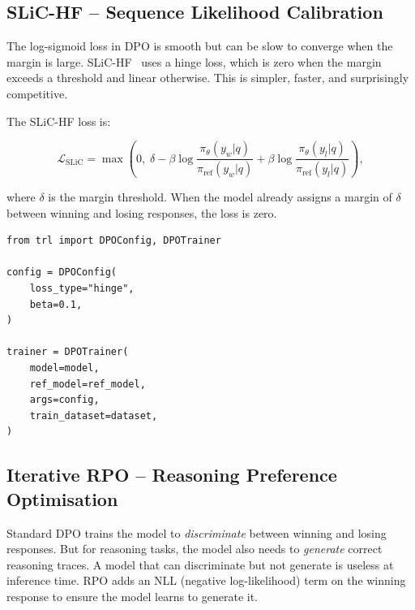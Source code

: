 \subsection{SLiC-HF -- Sequence Likelihood Calibration}
\label{sec:slic}

\begin{intuitionbox}
The log-sigmoid loss in DPO is smooth but can be slow to converge when the margin is large. SLiC-HF~\cite{zhao2023slichf} uses a hinge loss, which is zero when the margin exceeds a threshold and linear otherwise. This is simpler, faster, and surprisingly competitive.
\end{intuitionbox}

The SLiC-HF loss is:

\[
\mathcal{L}_{\text{SLiC}} = \max\!\left(0,\;
    \delta - \beta\log\frac{\pi_\theta(y_w|q)}{\pi_{\text{ref}}(y_w|q)}
    + \beta\log\frac{\pi_\theta(y_l|q)}{\pi_{\text{ref}}(y_l|q)}
  \right),
\]

where $\delta$ is the margin threshold. When the model already assigns a margin of $\delta$ between winning and losing responses, the loss is zero.

\begin{examplebox}
\begin{lstlisting}[style=pythonstyle]
from trl import DPOConfig, DPOTrainer

config = DPOConfig(
    loss_type="hinge",
    beta=0.1,
)

trainer = DPOTrainer(
    model=model,
    ref_model=ref_model,
    args=config,
    train_dataset=dataset,
)
\end{lstlisting}
\end{examplebox}

\subsection{Iterative RPO -- Reasoning Preference Optimisation}
\label{sec:rpo}

\begin{intuitionbox}
Standard DPO trains the model to \emph{discriminate} between winning and losing responses. But for reasoning tasks, the model also needs to \emph{generate} correct reasoning traces. A model that can discriminate but not generate is useless at inference time. RPO adds an NLL (negative log-likelihood) term on the winning response to ensure the model learns to generate it.
\end{intuitionbox}

